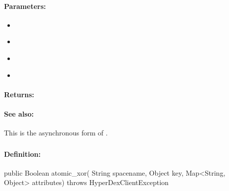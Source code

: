 \paragraph{Parameters:}
\begin{itemize}[noitemsep]
\item {}\\

\item {}\\

\item {}\\

\item {}\\

\end{itemize}

\paragraph{Returns:}


\paragraph{See also:}  This is the asynchronous form of .

\pagebreak
\subsubsection{}
\label{api:java:atomic_xor}


\paragraph{Definition:}
\begin{javacode}
public Boolean atomic_xor(
        String spacename,
        Object key,
        Map<String, Object> attributes) throws HyperDexClientException
\end{javacode}

